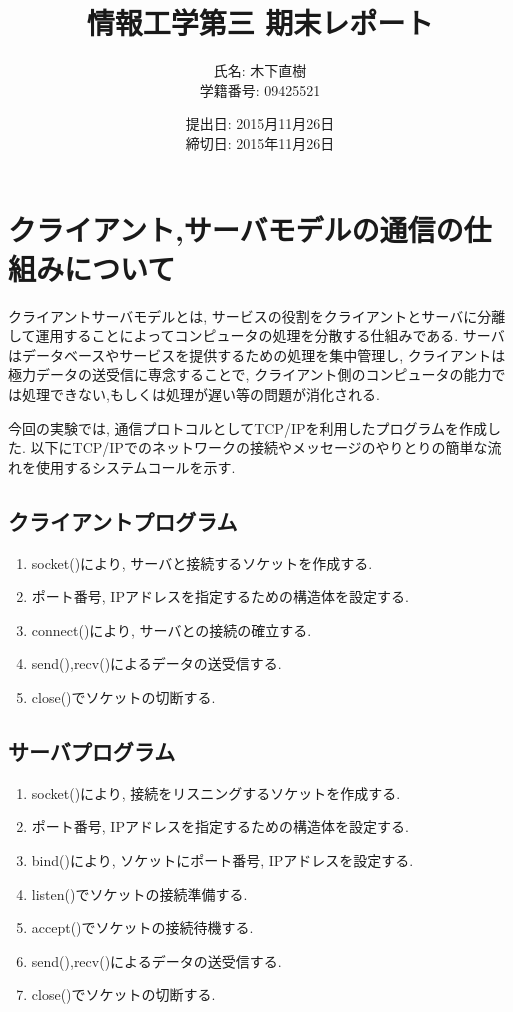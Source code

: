 \documentclass[a4j]{jarticle}
\title{情報工学第三 期末レポート}
\author{氏名: 木下直樹\\学籍番号: 09425521}
\date{提出日: 2015月11月26日\\締切日: 2015年11月26日}
\begin{document}
\maketitle

\section{クライアント,サーバモデルの通信の仕組みについて}
クライアントサーバモデルとは, サービスの役割をクライアントとサーバに分離して運用することによってコンピュータの処理を分散する仕組みである. 
サーバはデータベースやサービスを提供するための処理を集中管理し, クライアントは極力データの送受信に専念することで, クライアント側のコンピュータの能力では処理できない,もしくは処理が遅い等の問題が消化される. 

今回の実験では, 通信プロトコルとしてTCP/IPを利用したプログラムを作成した. 以下にTCP/IPでのネットワークの接続やメッセージのやりとりの簡単な流れを使用するシステムコールを示す.

\subsection{クライアントプログラム}
\begin{enumerate}
\item socket()により, サーバと接続するソケットを作成する.
\item ポート番号, IPアドレスを指定するための構造体を設定する.
\item connect()により, サーバとの接続の確立する.
\item send(),recv()によるデータの送受信する.
\item close()でソケットの切断する.
\end{enumerate}

\subsection{サーバプログラム}
\begin{enumerate}
\item socket()により, 接続をリスニングするソケットを作成する.
\item ポート番号, IPアドレスを指定するための構造体を設定する.
\item bind()により, ソケットにポート番号, IPアドレスを設定する.
\item listen()でソケットの接続準備する.
\item accept()でソケットの接続待機する.
\item send(),recv()によるデータの送受信する.
\item close()でソケットの切断する.
\end{enumerate}
\end{document}
